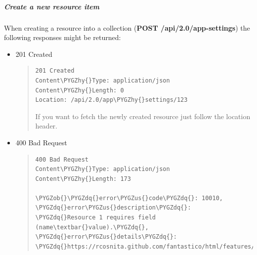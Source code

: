 \documentclass[letterpaper,10pt,english]{sphinxmanual}
\def\PYGZus{\char`\_}
\def\PYGZob{\char`\{}
\def\PYGZcb{\char`\}}
\def\PYGZhy{\char`\-}
\def\PYGZdq{\char`\"}
\begin{document}
\subparagraph{Create a new resource item}
\label{features/roa/rest_responses:create-a-new-resource-item}
When creating a resource into a collection (\textbf{POST /api/2.0/app-settings}) the following responses might be returned:
\begin{itemize}
\item {} 
201 Created
\begin{quote}

\begin{Verbatim}[commandchars=\\\{\}]
201 Created
Content\PYGZhy{}Type: application/json
Content\PYGZhy{}Length: 0
Location: /api/2.0/app\PYGZhy{}settings/123
\end{Verbatim}

If you want to fetch the newly created resource just follow the location header.
\end{quote}

\item {} 
400 Bad Request
\begin{quote}

\begin{Verbatim}[commandchars=\\\{\}]
400 Bad Request
Content\PYGZhy{}Type: application/json
Content\PYGZhy{}Length: 173

\PYGZob{}\PYGZdq{}error\PYGZus{}code\PYGZdq{}: 10010, \PYGZdq{}error\PYGZus{}description\PYGZdq{}: \PYGZdq{}Resource 1 requires field (name\textbar{}value).\PYGZdq{}, \PYGZdq{}error\PYGZus{}details\PYGZdq{}: \PYGZdq{}https://rcosnita.github.com/fantastico/html/features/roa/1000x.html\PYGZdq{}\PYGZcb{}
\end{Verbatim}
\end{quote}

\end{itemize}
\end{document}
